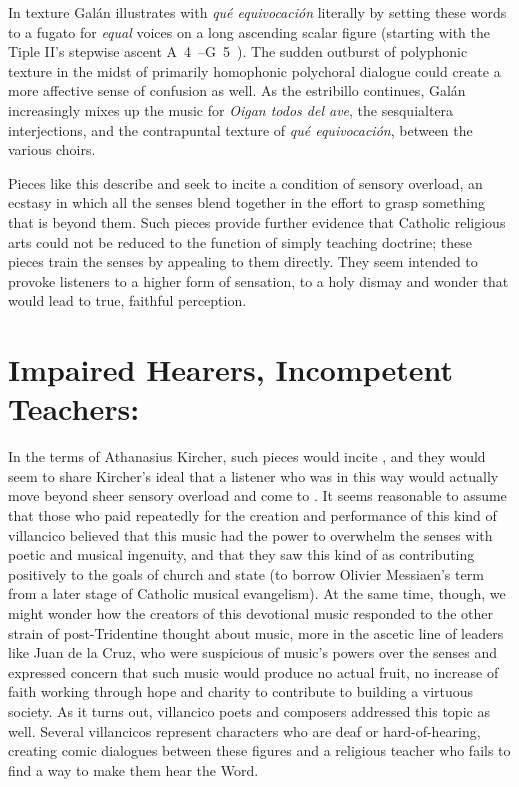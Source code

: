 \label{fig:Galan-Oigan-coloratio}
In texture Galán illustrates with \emph{qué equivocación} literally by setting these words to a fugato for \emph{equal} voices on a long ascending scalar figure (starting with the Tiple II's stepwise ascent A~4~--G~5~).
The sudden outburst of polyphonic texture in the midst of primarily homophonic polychoral dialogue could create a more affective sense of confusion as well.
As the estribillo continues, Galán increasingly mixes up the music for \emph{Oigan todos del ave}, the sesquialtera interjections, and the contrapuntal texture of \emph{qué equivocación}, between the various choirs.

Pieces like this describe and seek to incite a condition of sensory overload, an ecstasy in which all the senses blend together in the effort to grasp something that is beyond them.
Such pieces provide further evidence that Catholic religious arts could not be reduced to the function of simply teaching doctrine; these pieces train the senses by appealing to them directly.
They seem intended to provoke listeners to a higher form of sensation, to a holy dismay and wonder that would lead to true, faithful perception.


\section{Impaired Hearers, Incompetent Teachers: }

In the terms of Athanasius Kircher, such pieces would incite , and they would seem to share Kircher's ideal that a listener who was  in this way would actually move beyond sheer sensory overload and come to .
\Autocite[bk. 7, p. 550]{Kircher:Musurgia}  It seems reasonable to assume that those who paid repeatedly for the creation and performance of this kind of villancico believed that this music had the power to overwhelm the senses with poetic and musical ingenuity, and that they saw this kind of  as contributing positively to the goals of church and state (to borrow Olivier Messiaen's term from a later stage of Catholic musical evangelism).
At the same time, though, we might wonder how the creators of this devotional music responded to the other strain of post-Tridentine thought about music, more in the ascetic line of leaders like Juan de la Cruz, who were suspicious of music's powers over the senses and expressed concern that such music would produce no actual fruit, no increase of faith working through hope and charity to contribute to building a virtuous society.
As it turns out, villancico poets and composers addressed this topic as well.
Several villancicos represent characters who are deaf or hard-of-hearing, creating comic dialogues between these figures and a religious teacher who fails to find a way to make them hear the Word.

